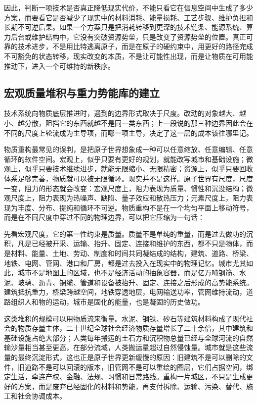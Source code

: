 因此，判断一项技术是否真正降低现实代价，不能只看它在信息空间中生成了多少方案，而要看它是否减少了现实中的材料消耗、能量损耗、工艺步骤、维护负担和长期不可逆后果。如果一个方案只是把消耗转移到更深的技术链条、能源系统、算力后台或维护结构中，它没有突破资源势垒，只是改变了资源势垒的位置。真正可靠的技术进步，不是用比特逃离原子，而是在原子的硬约束中，用更好的路径完成不可豁免的状态转移，现实改变的本质，不是让可能性出现，而是让物质在可用能推动下，进入一个可维持的新秩序。

\subsection{宏观质量堆积与重力势能库的建立}

技术系统向物质底层推进时，遇到的边界形式取决于尺度。改动的对象越大、越小、越分散，阻挡它的东西就越不是同一类东西；上一段说的那三种边界因此会在不同的尺度上轮流成为主导项，而哪一项主导，决定了这一层的成本该往哪里记。

物质重构最常见的误判，是把原子世界想象成一种可以任意缩放、任意编辑、任意循环的软件空间。宏观上，似乎只要有更好的规划，就能改写城市和基础设施；微观上，似乎只要技术继续进步，就能无限缩小、无限精密；资源上，似乎只要回收体系足够完善，物质就可以被无限循环。现实并不是这样。原子世界有尺度，尺度一变，阻力的形态就会改变：宏观尺度上，阻力表现为质量、惯性和沉没结构；微观尺度上，阻力表现为热噪声、缺陷、量子效应和散热压力；元素尺度上，阻力表现为丰度、分布、提纯和循环不可逆。物质重构不是在一个均匀平面上移动符号，而是在不同尺度中穿过不同的物理边界，可以把它压缩为一句话：


先看宏观尺度，它的第一性约束是质量。质量不是单纯的重量，而是过去做功的沉积，凡是已经被开采、运输、抬升、固定、连接和维护的东西，都不只是物体，而是材料、能量、土地、劳动、制度和时间共同凝结成的结构，建筑、道路、桥梁、地铁、电网、管网、港口和厂房，都是过去投入在现实中的物理记忆。城市尤其如此，城市不是地图上的区域，也不是经济活动的抽象容器，而是亿万吨钢筋、水泥、玻璃、沥青、铜缆、管道和设备被抬升、固定、连接之后形成的高势能系统。建筑抵抗重力，桥梁跨越空间，地铁穿透地层，电网输送功率，管网维持流动，道路组织人和物的运动，城市是固化的能量，也是凝固的历史做功。

这类堆积的规模可以用物质流来衡量。水泥、钢铁、砂石等建筑材料构成了现代社会的物质存量主体，二十世纪全球社会经济物质存量增长了二十余倍，其中建筑和基础设施占绝大部分；\cite{krausmann2017global}人类每年搬运的土石方和沉积物总量已经与全球河流的自然输沙量相当甚至更高，在部分流域，人类搬运量超过自然侵蚀量。\cite{syvitski2005impact}城市就是这些流量的最终沉淀形式，这也正是原子世界更新缓慢的原因：旧建筑不是可以删除的文件，旧道路不是可以回滚的版本，旧管网不是可以重绘的图层，它们占据空间，绑定生活，牵连产权、金融、法规、习惯和日常路线。重构一片城区，不只是生成更好的方案，而是废弃已经固化的材料和势能，再支付拆除、运输、污染、替代、施工和社会协调成本。

